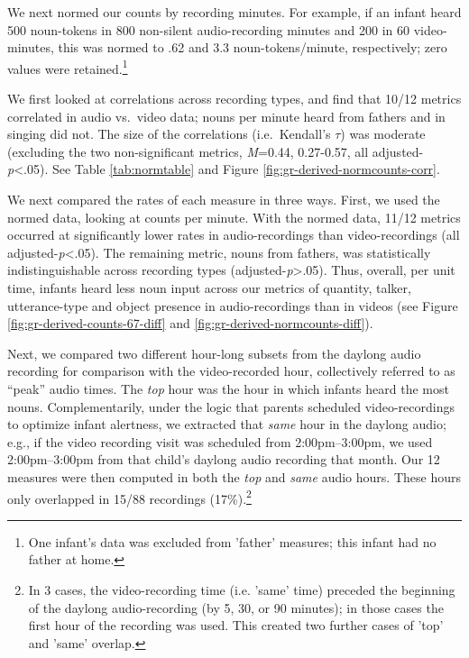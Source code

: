 \documentclass[man]{apa6}
\theoremstyle{definition}
\theoremstyle{definition}
\theoremstyle{definition}
\theoremstyle{remark}
\begin{document}
We next normed our counts by recording minutes. For example, if an
infant heard 500 noun-tokens in 800 non-silent audio-recording minutes
and 200 in 60 video-minutes, this was normed to .62 and 3.3
noun-tokens/minute, respectively; zero values were
retained.\footnote{One infant's data was excluded from 'father' measures; this infant had no father at home.}

We first looked at correlations across recording types, and find that
10/12 metrics correlated in audio vs.~video data; nouns per minute heard
from fathers and in singing did not. The size of the correlations
(i.e.~Kendall's \(\tau\)) was moderate (excluding the two
non-significant metrics, \emph{M}=0.44, 0.27-0.57, all
adjusted-\emph{p}\textless{}.05). See Table \ref{tab:normtable} and
Figure \ref{fig:gr-derived-normcounts-corr}.

We next compared the rates of each measure in three ways. First, we used
the normed data, looking at counts per minute. With the normed data,
11/12 metrics occurred at significantly lower rates in audio-recordings
than video-recordings (all adjusted-\emph{p}\textless{}.05). The
remaining metric, nouns from fathers, was statistically
indistinguishable across recording types
(adjusted-\emph{p}\textgreater{}.05). Thus, overall, per unit time,
infants heard less noun input across our metrics of quantity, talker,
utterance-type and object presence in audio-recordings than in videos
(see Figure \ref{fig:gr-derived-counts-67-diff} and
\ref{fig:gr-derived-normcounts-diff}).

Next, we compared two different hour-long subsets from the daylong audio
recording for comparison with the video-recorded hour, collectively
referred to as \enquote{peak} audio times. The \emph{top} hour was the
hour in which infants heard the most nouns. Complementarily, under the
logic that parents scheduled video-recordings to optimize infant
alertness, we extracted that \emph{same} hour in the daylong audio;
e.g., if the video recording visit was scheduled from 2:00pm--3:00pm, we
used 2:00pm--3:00pm from that child's daylong audio recording that
month. Our 12 measures were then computed in both the \emph{top} and
\emph{same} audio hours. These hours only overlapped in 15/88 recordings
(17\%).\footnote{In 3 cases, the video-recording time (i.e. 'same' time) preceded the beginning of the daylong audio-recording (by 5, 30, or 90 minutes); in those cases the first hour of the recording was used. This created two further cases of 'top' and 'same' overlap.}
\end{document}
